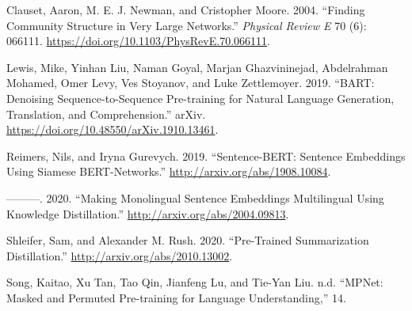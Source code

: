\documentclass{article}
\newlength{\cslhangindent}
\newlength{\cslentryspacingunit} %
\newenvironment{CSLReferences}[2] %
 {%
  \setlength{\parindent}{0pt}
  \ifodd #1
  \let\oldpar\par
  \def\par{\hangindent=\cslhangindent\oldpar}
  \fi
  \setlength{\parskip}{#2\cslentryspacingunit}
 }%
 {}
\begin{document}
\hphantom{em}

\hypertarget{refs}{}
\begin{CSLReferences}{1}{0}
\leavevmode{}%
Clauset, Aaron, M. E. J. Newman, and Cristopher Moore. 2004. {``Finding
Community Structure in Very Large Networks.''} \emph{Physical Review E}
70 (6): 066111. \url{https://doi.org/10.1103/PhysRevE.70.066111}.

\leavevmode{}%
Lewis, Mike, Yinhan Liu, Naman Goyal, Marjan Ghazvininejad, Abdelrahman
Mohamed, Omer Levy, Ves Stoyanov, and Luke Zettlemoyer. 2019. {``{BART}:
{Denoising Sequence-to-Sequence Pre-training} for {Natural Language
Generation}, {Translation}, and {Comprehension}.''} {arXiv}.
\url{https://doi.org/10.48550/arXiv.1910.13461}.

\leavevmode{}%
Reimers, Nils, and Iryna Gurevych. 2019. {``Sentence-{BERT}: {Sentence
Embeddings} Using {Siamese BERT-Networks}.''}
\url{http://arxiv.org/abs/1908.10084}.

\leavevmode{}%
---------. 2020. {``Making {Monolingual Sentence Embeddings
Multilingual} Using {Knowledge Distillation}.''}
\url{http://arxiv.org/abs/2004.09813}.

\leavevmode{}%
Shleifer, Sam, and Alexander M. Rush. 2020. {``Pre-Trained
{Summarization Distillation}.''} \url{http://arxiv.org/abs/2010.13002}.

\leavevmode{}%
Song, Kaitao, Xu Tan, Tao Qin, Jianfeng Lu, and Tie-Yan Liu. n.d.
{``{MPNet}: {Masked} and {Permuted Pre-training} for {Language
Understanding},''} 14.

\end{CSLReferences}



\end{document}
